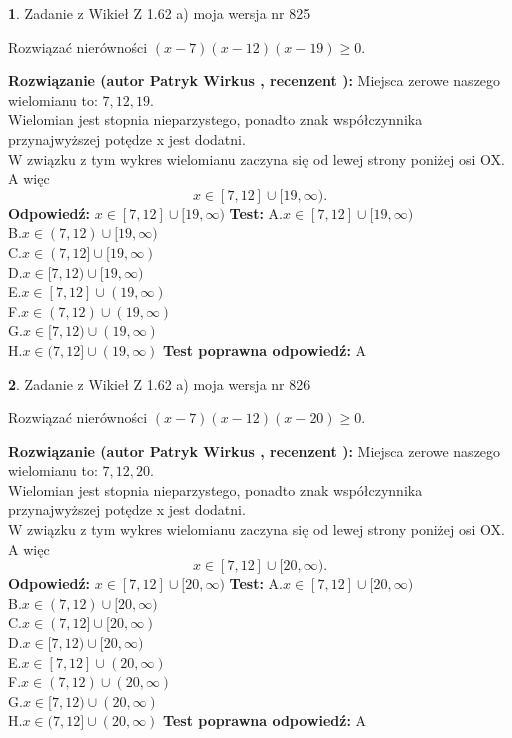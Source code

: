 \documentclass[12pt, a4paper]{article}
\theoremstyle{definition} %
\newtheorem{zad}{}
\newcommand{\zadStart}[1]{\begin{zad}#1\newline}
\newcommand{\zadStop}{\end{zad}}
\newcommand{\rozwStart}[2]{\noindent \textbf{Rozwiązanie (autor #1 , recenzent #2): }\newline}
\newcommand{\rozwStop}{\newline}
\newcommand{\odpStart}{\noindent \textbf{Odpowiedź:}\newline}
\newcommand{\odpStop}{\newline}
\newcommand{\testStart}{\noindent \textbf{Test:}\newline}
\newcommand{\testStop}{\newline}
\newcommand{\kluczStart}{\noindent \textbf{Test poprawna odpowiedź:}\newline}
\newcommand{\kluczStop}{\newline}
\begin{document}
\zadStart{Zadanie z Wikieł Z 1.62 a) moja wersja nr 825}

Rozwiązać nierówności $(x-7)(x-12)(x-19)\ge0$.
\zadStop
\rozwStart{Patryk Wirkus}{}
Miejsca zerowe naszego wielomianu to: $7, 12, 19$.\\
Wielomian jest stopnia nieparzystego, ponadto znak współczynnika przy\linebreak najwyższej potędze x jest dodatni.\\ W związku z tym wykres wielomianu zaczyna się od lewej strony poniżej osi OX. A więc $$x \in [7,12] \cup [19,\infty).$$
\rozwStop
\odpStart
$x \in [7,12] \cup [19,\infty)$
\odpStop
\testStart
A.$x \in [7,12] \cup [19,\infty)$\\
B.$x \in (7,12) \cup [19,\infty)$\\
C.$x \in (7,12] \cup [19,\infty)$\\
D.$x \in [7,12) \cup [19,\infty)$\\
E.$x \in [7,12] \cup (19,\infty)$\\
F.$x \in (7,12) \cup (19,\infty)$\\
G.$x \in [7,12) \cup (19,\infty)$\\
H.$x \in (7,12] \cup (19,\infty)$
\testStop
\kluczStart
A
\kluczStop



\zadStart{Zadanie z Wikieł Z 1.62 a) moja wersja nr 826}

Rozwiązać nierówności $(x-7)(x-12)(x-20)\ge0$.
\zadStop
\rozwStart{Patryk Wirkus}{}
Miejsca zerowe naszego wielomianu to: $7, 12, 20$.\\
Wielomian jest stopnia nieparzystego, ponadto znak współczynnika przy\linebreak najwyższej potędze x jest dodatni.\\ W związku z tym wykres wielomianu zaczyna się od lewej strony poniżej osi OX. A więc $$x \in [7,12] \cup [20,\infty).$$
\rozwStop
\odpStart
$x \in [7,12] \cup [20,\infty)$
\odpStop
\testStart
A.$x \in [7,12] \cup [20,\infty)$\\
B.$x \in (7,12) \cup [20,\infty)$\\
C.$x \in (7,12] \cup [20,\infty)$\\
D.$x \in [7,12) \cup [20,\infty)$\\
E.$x \in [7,12] \cup (20,\infty)$\\
F.$x \in (7,12) \cup (20,\infty)$\\
G.$x \in [7,12) \cup (20,\infty)$\\
H.$x \in (7,12] \cup (20,\infty)$
\testStop
\kluczStart
A
\kluczStop
\end{document}
